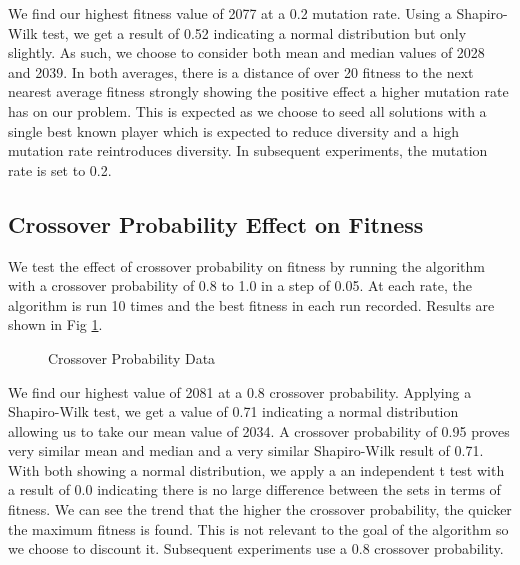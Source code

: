 \documentclass[11pt,a4paper]{article}
\begin{document}
We find our highest fitness value of 2077 at a 0.2 mutation rate. Using a Shapiro-Wilk test, we get a result of 0.52 indicating a normal distribution but only slightly. As such, we choose to consider both mean and median values of 2028 and 2039. In both averages, there is a distance of over 20 fitness to the next nearest average fitness strongly showing the positive effect a higher mutation rate has on our problem.
This is expected as we choose to seed all solutions with a single best known player which is expected to reduce diversity and a high mutation rate reintroduces diversity. In subsequent experiments, the mutation rate is set to 0.2.

\subsection{Crossover Probability Effect on Fitness}
We test the effect of crossover probability on fitness by running the algorithm with a crossover probability of 0.8 to 1.0 in a step of 0.05. At each rate, the algorithm is run 10 times and the best fitness in each run recorded. Results are shown in Fig \ref{fig:CXRateFit}.

\begin{figure}
\centering
{}
\qquad
{}
\caption{Crossover Probability Data}
\label{fig:CXRateFit}
\end{figure}

We find our highest value of 2081 at a 0.8 crossover probability. Applying a Shapiro-Wilk test, we get a value of 0.71 indicating a normal distribution allowing us to take our mean value of 2034. A crossover probability of 0.95 proves very similar mean and median and a very similar Shapiro-Wilk result of 0.71. With both showing a normal distribution, we apply a an independent t test with a result of 0.0 indicating there is no large difference between the sets in terms of fitness. We can see the trend that the higher the crossover probability, the quicker the maximum fitness is found. This is not relevant to the goal of the algorithm so we choose to discount it.
Subsequent experiments use a 0.8 crossover probability.
\end{document}
